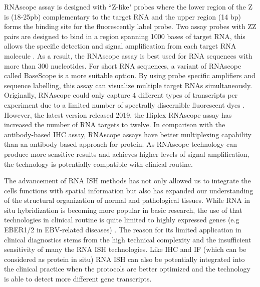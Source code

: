 RNAscope assay is designed with ``Z-like" probes where the lower region of the Z is (18-25pb) complementary to the target RNA and the upper region (14 bp) forms the binding site for the fluorescently label probe. Two assay probes with ZZ pairs are designed to bind in a region spanning 1000 bases of target RNA, this allows the specific detection and signal amplification from each target RNA molecule \cite{solanki2020visualization}. As a result, the RNAscope assay is best used for RNA sequences with more than 300 nucleotides. For short RNA sequences, a variant of RNAscope called BaseScope is a more suitable option. By using probe specific amplifiers and sequence labelling, this assay can visualize multiple target RNAs simultaneously. Originally, RNAscope could only capture 4 different types of transcripts per experiment due to a limited number of spectrally discernible fluorescent dyes \cite{wang2012rnascope}. However, the latest version released 2019, the Hiplex RNAscope assay has increased the number of RNA targets to twelve. In comparison with the antibody-based IHC assay, RNAscope assays have better multiplexing capability than an antibody-based approach for protein. As RNAscope technology can produce more sensitive results and achieves higher levels of signal amplification, the technology is potentially compatible with clinical routine.

The advancement of RNA ISH methods has not only allowed us to integrate the cells functions with spatial information but also has expanded our understanding of the structural organization of normal and pathological tissues. While RNA in situ hybridization is becoming more popular in basic research, the use of that technologies in clinical routine is quite limited to highly expressed genes (e.g EBER1/2 in EBV-related diseases) \cite{gulley2001molecular}. The reason for its limited application in clinical diagnostics stems from the high technical complexity and the insufficient sensitivity of many the RNA ISH technologies. Like IHC and IF (which can be considered as protein in situ) RNA ISH can also be potentially integrated into the clinical practice when the protocols are better optimized and the technology is able to detect more different gene transcripts.


